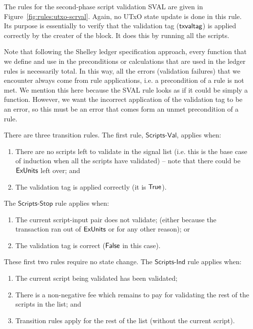 The rules for the second-phase script validation SVAL are given in
Figure~\ref{fig:rules:utxo-scrval}. Again, no UTxO state update
is done in this rule. Its purpose is essentially to verify that the
validation tag ($\mathsf{txvaltag}$) is applied correctly by the creater of
the block.  It does this by running all the scripts.

Note that following the Shelley ledger specification approach, every function
that we define and use in the preconditions or calculations that are used in the ledger rules is
necessarily total.
In this way, all the errors (validation failures) that we encounter always come from
rule applications, i.e. a precondition of a rule is not met.
We mention this here because the SVAL rule looks as if it could be
simply a function. However, we want the incorrect application of the
validation tag to be an error, so this must be an error that comes form
an unmet precondition of a rule.

There are three transition rules.
The first rule, $\mathsf{Scripts\mbox{-}Val}$, applies when:

\begin{enumerate}
\item There
are no scripts left to validate in the signal list (i.e. this is the base case of
induction when all the scripts have validated) -- note that there could be $\mathsf{ExUnits}$ left over; and
\item The validation tag is applied correctly (it is $\mathsf{True}$).
\end{enumerate}

The $\mathsf{Scripts\mbox{-}Stop}$ rule applies when:

\begin{enumerate}
  \item The current script-input pair  does not validate;
  (either because the transaction ran out of $\mathsf{ExUnits}$ or for any other reason); or
  \item The validation tag is correct ($\mathsf{False}$ in this case).
\end{enumerate}

These first two rules require no state change.
The $\mathsf{Scripts\mbox{-}Ind}$ rule applies when:

\begin{enumerate}
  \item The current script being validated has been validated;
  \item There is a non-negative fee which remains to pay for validating
  the rest of the scripts in the list; and
  \item Transition rules apply for the rest of the list (without the current script).
\end{enumerate}

